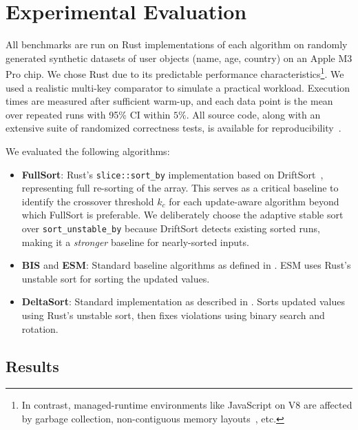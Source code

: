\section{Experimental Evaluation}
\label{sec:experiments}

All benchmarks are run on Rust implementations of each algorithm on randomly generated synthetic datasets of user objects (name, age, country) on an Apple M3 Pro chip. We chose Rust due to its predictable performance characteristics\footnote{In contrast, managed-runtime environments like JavaScript on V8 are affected by garbage collection, non-contiguous memory layouts~\cite{v8elementskinds}, etc.}. We used a realistic multi-key comparator to simulate a practical workload. Execution times are measured after sufficient warm-up, and each data point is the mean over repeated runs with 95\% CI within $5\%$. All source code, along with an extensive suite of randomized correctness tests, is available for reproducibility~\cite{deltasort-repo}.

We evaluated the following algorithms:
\begin{itemize}
  \item \textbf{FullSort}: Rust's \texttt{slice::sort\_by} implementation based on DriftSort~\cite{driftsort}, representing full re-sorting of the array. This serves as a critical baseline to identify the crossover threshold $k_c$ for each update-aware algorithm beyond which FullSort is preferable. We deliberately choose the adaptive stable sort over \texttt{sort\_unstable\_by} because DriftSort detects existing sorted runs, making it a \emph{stronger} baseline for nearly-sorted inputs.

  \item \textbf{BIS} and \textbf{ESM}: Standard baseline algorithms as defined in . ESM uses Rust's unstable sort for sorting the updated values.

  \item \textbf{DeltaSort}: Standard implementation as described in . Sorts updated values using Rust's unstable sort, then fixes violations using binary search and rotation.
\end{itemize}

\subsection{Results}

